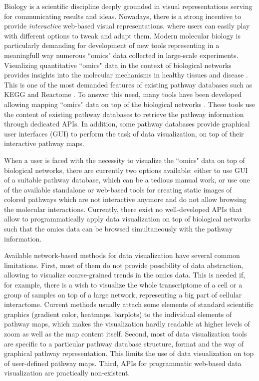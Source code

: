 \documentclass[a4,center,fleqn]{NAR}
\begin{document}
Biology is a scientific discipline deeply grounded in visual representations
serving for communicating results and ideas. Nowadays, there is a strong
incentive to provide \emph{interactive} web-based visual representations, where
users can easily play with different options to tweak and adapt them. Modern
molecular biology is particularly demanding for development of new tools
representing in a meaningfull way numerous ``omics" data collected in
large-scale experiments. Visualizing quantitative ``omics" data in the context
of biological networks provides insights into the molecular mechanisms in
healthy tissues and disease \cite{Gehlenborg2010,Barillot2012}. This is one of
the most demanded features of existing pathway databases such as KEGG
and Reactome \cite{Kanehisa2012, Croft2014}. To answer this need, many tools
have been developed allowing mapping ``omics" data on top of the biological
networks \cite{Arakawa2005,vanIersel2008,Luo2013, Nishida2014}. These tools use
the content of existing pathway databases to retrieve the pathway information
through dedicated APIs. In addition, some pathway databases provide graphical
user interfaces (GUI) to perform the task of data visualization, on top of
their interactive pathway maps.

When a user is faced with the necessity to visualize the ``omics" data on top of
biological networks, there are currently two options available: either to use
GUI of a suitable pathway database, which can be a tedious manual work, or use
one of the available standalone or web-based tools for creating static images
of colored pathways which are not interactive anymore and do not allow browsing
the molecular interactions. Currently, there exist no well-developed APIs
that allow to programmatically apply data visualization on top of biological
networks such that the omics data can be browsed simultaneously with the
pathway information.

Available network-based methods for data visualization have several common
limitations. First, most of them do not provide possibility of data
abstraction, allowing to visualize coarse-grained trends in the omics data.
This is needed if, for example, there is a wish to visualize the whole
transcriptome of a cell or a group of samples on top of a large network,
representing a big part of cellular interactome. Current methods usually attach
some elements of standard scientific graphics (gradient color, heatmaps,
barplots) to the individual elements of pathway maps, which makes the
visualization hardly readable at higher levels of zoom as well as the map
content itself. Second, most of data visualization tools are specific to a
particular pathway database structure, format and the way of graphical pathway
representation. This limits the use of data visualization on top of
user-defined pathway maps. Third, APIs for programmatic web-based data
visualization are practically non-existent.
\end{document}
